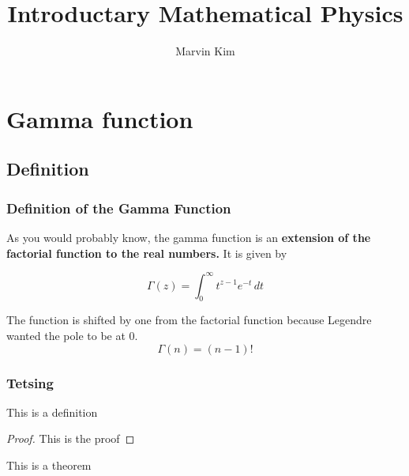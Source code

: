\documentclass{sptr_presentation}
\title{Introductary Mathematical Physics}
\institute{Spanning Tree}
\author{Marvin Kim}
\date{}
\begin{document}
\frame{\titlepage}

\frame{\tableofcontents}

\section{Gamma function}

\subsection{Definition}

\begin{frame}
	\frametitle{Definition of the Gamma Function}

	As you would probably know, the gamma function is an \textbf{extension of the factorial function to the real numbers.} \pause
	It is given by
	\begin{definition}
		\begin{equation}
			\Gamma(z) = \int_0^\infty t^{z-1} e^{-t} \, dt
		\end{equation} 
	\end{definition}
	\pause The function is shifted by one from the factorial function because Legendre wanted the pole to be at $0$.
	\begin{equation}
		\Gamma(n) = (n-1)!
	\end{equation}
\end{frame}

\begin{frame}
	\frametitle{Tetsing}

	\begin{definition}
		This is a definition
	\end{definition}

	\begin{proof}
		This is the proof
	\end{proof}
	\begin{theorem}
		This is a theorem
	\end{theorem}

\end{frame}
\end{document}
